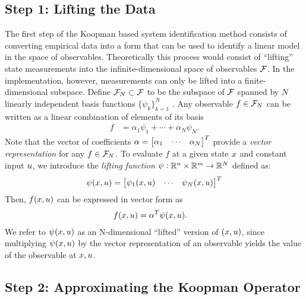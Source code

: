 \subsection{Step 1: Lifting the Data}   \label{sec:step1}

The first step of the Koopman based system identification method consists of converting empirical data into a form that can be used to identify a linear model in the space of observables.
Theoretically this process would consist of ``lifting'' state measurements into the infinite-dimensional space of observables $\mathcal{F}$.
In the implementation, however, measurements can only be lifted into a finite-dimensional subspace.
Define $\mathcal{F}_N \subset \mathcal{F}$ to be the subspace of $\mathcal{F}$ spanned by $N$ linearly independent basis functions $\{ \psi_k \}_{k=1}^N$ 
.
%
Any observable ${f \in \mathcal{F}_N}$ can be written as a linear combination of elements of its basis
\begin{align}
    f &= \alpha_1 \psi_{1} + \cdots + \alpha_N \psi_N.
\end{align}
Note that the vector of coefficients ${\alpha = \begin{bmatrix} \alpha_1 & \cdots & \alpha_N \end{bmatrix}^T}$ provide a \emph{vector representation} for any $f \in \mathcal{F}_N$.
To evaluate $f$ at a given state $x$ and constant input $u$, we introduce the \emph{lifting function} ${\psi}:\mathbb{R}^n \times \mathbb{R}^m \to \mathbb{R}^N$ defined as:
\begin{align}
    {\psi}(x, u) = \begin{bmatrix}  \psi_1(x, u) & \cdots & \psi_N(x, u) \end{bmatrix}^T
    \label{eq:lift}
\end{align}
Then, $f(x, u)$ can be expressed in vector form as
\begin{align}
    f(x, u) &= {\alpha}^T {\psi}(x, u).
    \label{eq:fxu}
\end{align}
We refer to ${\psi}(x, u)$ as an N-dimensional ``lifted'' version of ${(x, u)}$, since multiplying ${\psi}(x, u)$ by the vector representation of an observable yields the value of the observable at $x, u$.



\subsection{Step 2: Approximating the Koopman Operator} \label{sec:step2}


